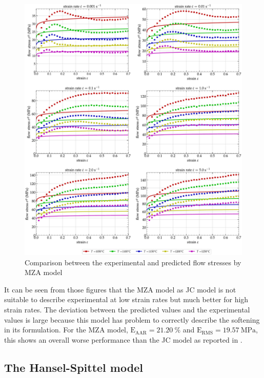 \documentclass[twoside,english,1p,final,sort&compress]{elsarticle}
\theoremstyle{plain}
\DeclareRobustCommand{\RMSE}{\text{E}_\text{RMS}}
\DeclareRobustCommand{\AARE}{\text{E}_\text{AAR}}
\DeclareRobustCommand{\MPa}{\text{MPa}}
\begin{document}
\begin{figure}[!ht]
\centering
\includegraphics[width=\columnwidth]
{Figures/CompExp-MZA-6}
\caption{Comparison between the experimental and predicted flow stresses by MZA model}
\label{fig:CompExp-MZA-6}
\end{figure}
It can be seen from those figures that the MZA model as JC model is not suitable to describe experimental at low strain rates but much better for high strain rates.
The deviation between the predicted values and the experimental values is large because this model has problem to correctly describe the softening in its formulation.
For the MZA model, $\AARE=21.20~\%$ and $\RMSE=19.57~\MPa$, this shows an overall worse performance than the JC model as reported in \cite{TizeMha-2022}.

\subsection{The Hansel-Spittel model\label{sec:HSmodel}}
\end{document}
